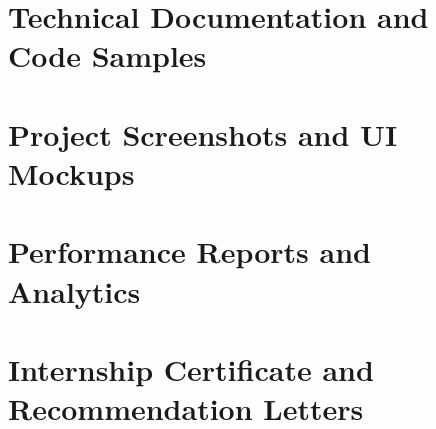 \documentclass[a4paper, 11pt, oneside]{report}
\begin{document}

\appendix
\chapter{Technical Documentation and Code Samples}

\chapter{Project Screenshots and UI Mockups}

\chapter{Performance Reports and Analytics}

\chapter{Internship Certificate and Recommendation Letters}






\end{document}
